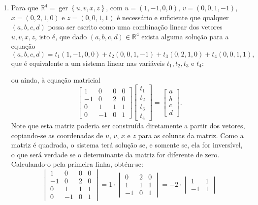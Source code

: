 \documentclass[12pt,a4paper]{article}
\newcommand*\ger[1]{\operatorname{ger}\left\{#1\right\}}
\newcommand*\R{\mathbb{R}}
\begin{document}
\begin{enumerate}
\item Para que $\R^4 = \ger{u,v,x,z}$, com $u=(1,-1,0,0)$, $v=(0,0,1,-1)$, $x=(0,2,1,0)$ e $z=(0,0,1,1)$ é necessário e suficiente que qualquer $(a,b,c,d)$ possa ser escrito como uma combinação linear dos vetores $u,v,x,z$, isto é, que dado $(a,b,c,d) \in \R^4$ exista alguma solução para a equação
\[
(a,b,c,d) = t_1 (1,-1,0,0) + t_2 (0,0,1,-1)+ t_3 (0,2,1,0)+ t_4 (0,0,1,1),
\]
que é equivalente a um sistema linear nas variáveis $t_1, t_2, t_3$ e $t_4$:


ou ainda, à equação matricial
\[
\begin{bmatrix}
 1 &  0 & 0 & 0 \\
-1 &  0 & 2 & 0 \\
 0 &  1 & 1 & 1 \\
 0 & -1 & 0 & 1
\end{bmatrix}
\begin{bmatrix}
t_1 \\
t_2 \\
t_3 \\
t_4
\end{bmatrix}
=
\begin{bmatrix}
a \\
b \\
c \\
d
\end{bmatrix}.
\]
Note que esta matriz poderia ser construída diretamente a partir dos vetores, copiando-se as coordenadas de $u$, $v$, $x$ e $z$ para as colunas da matriz. Como a matriz é quadrada, o sistema terá solução se, e somente se, ela for inversível, o que será verdade se o determinante da matriz for diferente de zero. Calculando-o pela primeira linha, obtém-se:
\[
\begin{vmatrix}
 1 &  0 & 0 & 0 \\
-1 &  0 & 2 & 0 \\
 0 &  1 & 1 & 1 \\
 0 & -1 & 0 & 1
\end{vmatrix}
=
1 \cdot
\begin{vmatrix}
 0 & 2 & 0 \\
 1 & 1 & 1 \\
-1 & 0 & 1
\end{vmatrix}
=
-2 \cdot
\begin{vmatrix}
 1 & 1 \\
-1 & 1
\end{vmatrix}
\]
\end{enumerate}
\end{document}
